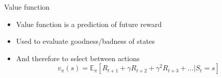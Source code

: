 \bgroup
\begin{frame}{Value function}
\begin{itemize}
\item Value function is a prediction of future reward
\item Used to evaluate goodness/badness of states
\item And therefore to select between actions
\begin{equation*}
v_{\pi}(s) = \mathbb{E}_{\pi}[R_{t+1}+\gamma R_{t+2} + \gamma^2 R_{t+3} + \ldots | S_t = s]
\end{equation*}
\end{itemize}
\end{frame}
\egroup